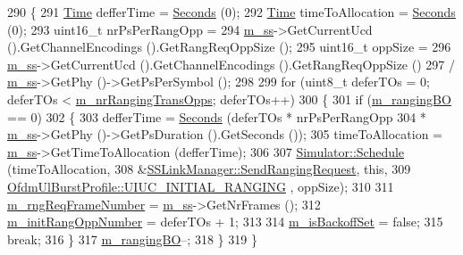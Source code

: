 \begin{DoxyCode}
290 \{
291   \hyperlink{namespacens3_1_1TracedValueCallback_a7ffd3e7c142ffe7c8a1d2db9b8de38ec}{Time} defferTime = \hyperlink{group__timecivil_ga33c34b816f8ff6628e33d5c8e9713b9e}{Seconds} (0);
292   \hyperlink{namespacens3_1_1TracedValueCallback_a7ffd3e7c142ffe7c8a1d2db9b8de38ec}{Time} timeToAllocation = \hyperlink{group__timecivil_ga33c34b816f8ff6628e33d5c8e9713b9e}{Seconds} (0);
293   uint16\_t nrPsPerRangOpp =
294     \hyperlink{classns3_1_1SSLinkManager_a44506c63befdc33eb0e0b4ba7f93d498}{m\_ss}->GetCurrentUcd ().GetChannelEncodings ().GetRangReqOppSize ();
295   uint16\_t oppSize =
296     \hyperlink{classns3_1_1SSLinkManager_a44506c63befdc33eb0e0b4ba7f93d498}{m\_ss}->GetCurrentUcd ().GetChannelEncodings ().GetRangReqOppSize ()
297     / \hyperlink{classns3_1_1SSLinkManager_a44506c63befdc33eb0e0b4ba7f93d498}{m\_ss}->GetPhy ()->GetPsPerSymbol ();
298 
299   \textcolor{keywordflow}{for} (uint8\_t deferTOs = 0; deferTOs < \hyperlink{classns3_1_1SSLinkManager_a5847dd2b913c5b70cd3a4ea1c9bbb8c4}{m\_nrRangingTransOpps}; deferTOs++)
300     \{
301       \textcolor{keywordflow}{if} (\hyperlink{classns3_1_1SSLinkManager_a15d8026ec20372ce2855c237591af9f5}{m\_rangingBO} == 0)
302         \{
303           defferTime = \hyperlink{group__timecivil_ga33c34b816f8ff6628e33d5c8e9713b9e}{Seconds} (deferTOs * nrPsPerRangOpp
304                                 * \hyperlink{classns3_1_1SSLinkManager_a44506c63befdc33eb0e0b4ba7f93d498}{m\_ss}->GetPhy ()->GetPsDuration ().GetSeconds ());
305           timeToAllocation = \hyperlink{classns3_1_1SSLinkManager_a44506c63befdc33eb0e0b4ba7f93d498}{m\_ss}->GetTimeToAllocation (defferTime);
306 
307           \hyperlink{classns3_1_1Simulator_a671882c894a08af4a5e91181bf1eec13}{Simulator::Schedule} (timeToAllocation,
308                                &\hyperlink{classns3_1_1SSLinkManager_a588462b7fadd024760b556fc5e951d2c}{SSLinkManager::SendRangingRequest}, \textcolor{keyword}{this},
309                                \hyperlink{classns3_1_1OfdmUlBurstProfile_ae528783c4b3c6700ff49dfd7a555cb3daaea7b6256d4bcd0125f0248c0560c94e}{OfdmUlBurstProfile::UIUC\_INITIAL\_RANGING}
      , oppSize);
310 
311           \hyperlink{classns3_1_1SSLinkManager_aa1819c668290b52001071139ed22374a}{m\_rngReqFrameNumber} = \hyperlink{classns3_1_1SSLinkManager_a44506c63befdc33eb0e0b4ba7f93d498}{m\_ss}->GetNrFrames ();
312           \hyperlink{classns3_1_1SSLinkManager_a268da8bf334b79ef5d61926c7735cc3e}{m\_initRangOppNumber} = deferTOs + 1;
313 
314           \hyperlink{classns3_1_1SSLinkManager_aacf699c5c88344a4ed0f27f5f4558ea3}{m\_isBackoffSet} = \textcolor{keyword}{false};
315           \textcolor{keywordflow}{break};
316         \}
317       \hyperlink{classns3_1_1SSLinkManager_a15d8026ec20372ce2855c237591af9f5}{m\_rangingBO}--;
318     \}
319 \}
\end{DoxyCode}


